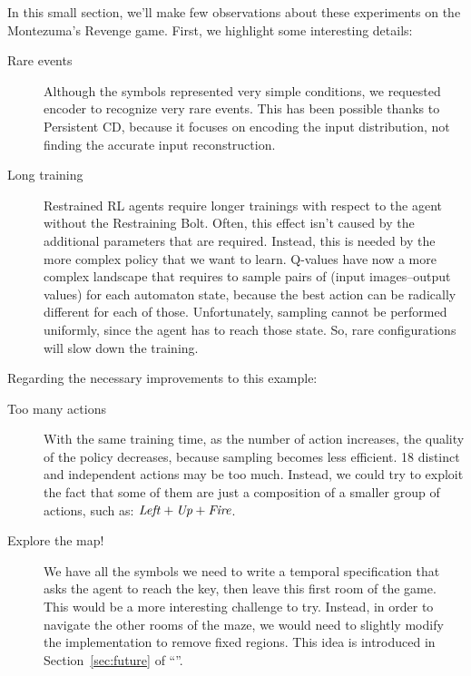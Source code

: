 In this small section, we'll make few observations about these experiments on
the Montezuma's Revenge game. First, we highlight some interesting details:
\begin{description}

	\item [Rare events] Although the symbols represented very simple conditions,
		we requested encoder to recognize very rare events. This has been possible
		thanks to Persistent CD, because it focuses on encoding the input
		distribution, not finding the accurate input reconstruction.

	\item [Long training] Restrained RL agents require longer trainings with
		respect to the agent without the Restraining Bolt. Often, this effect
		isn't caused by the additional parameters that are required. Instead, this
		is needed by the more complex policy that we want to learn. Q-values have
		now a more complex landscape that requires to sample pairs of (input
		images--output values) for each automaton state, because the best action
		can be radically different for each of those. Unfortunately, sampling
		cannot be performed uniformly, since the agent has to reach those state.
		So, rare configurations will slow down the training.

\end{description}

Regarding the necessary improvements to this example:
\begin{description}

	\item [Too many actions] With the same training time, as the number of
		action increases, the quality of the policy decreases, because sampling
		becomes less efficient. 18 distinct and independent actions may be too
		much. Instead, we could try to exploit the fact that some of them are just
		a composition of a smaller group of actions, such as: $\text{\textit{Left}} +
		\text{\textit{Up}} + \text{\textit{Fire}}$.

	\item [Explore the map!] We have all the symbols we need to write a temporal
		specification that asks the agent to reach the key, then leave this first
		room of the game. This would be a more interesting challenge to try.
		Instead, in order to navigate the other rooms of the maze, we would need
		to slightly modify the implementation to remove fixed regions. This idea
		is introduced in Section~\ref{sec:future} of ``''.

\end{description}

